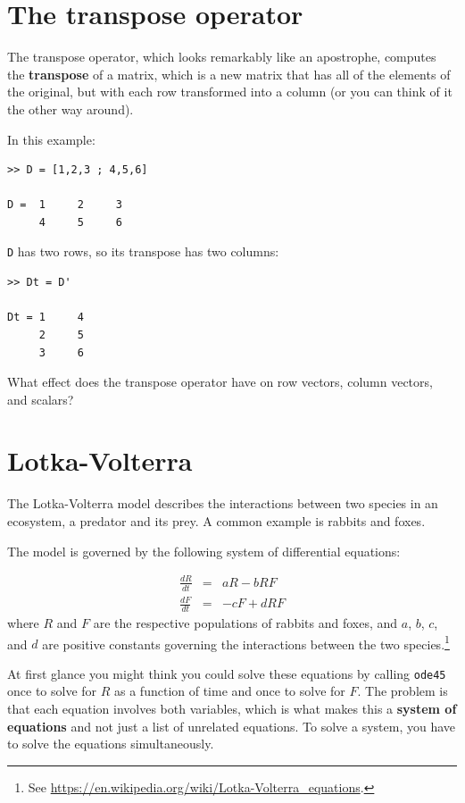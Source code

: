 \documentclass{book}
\begin{document}
\section{The transpose operator}

The transpose operator, which looks remarkably like an apostrophe,
computes the {\bf transpose} of a matrix, which is a new matrix
that has all of the elements of the original, but with each row
transformed into a column (or you can think of it the other way around).

In this example:

\begin{verbatim}
>> D = [1,2,3 ; 4,5,6]

D =  1     2     3
     4     5     6
\end{verbatim}

{\tt D} has two rows, so its transpose has two columns:

\begin{verbatim}
>> Dt = D'

Dt = 1     4
     2     5
     3     6
\end{verbatim}

\begin{ex}
What effect does the transpose operator
have on row vectors, column vectors, and scalars?
\end{ex}


\section{Lotka-Volterra}
\label{lotka}

The Lotka-Volterra model describes the interactions between two
species in an ecosystem, a predator and its prey.  A common example
is rabbits and foxes.

The model is governed by the following system of differential equations:

\begin{eqnarray}
    \frac{dR}{dt} &=& a R - b R F
    \\
    \frac{dF}{dt} &=& - c F + d R F
\end{eqnarray}
%
where $R$ and $F$ are the respective populations of rabbits and foxes,
and $a$, $b$, $c$, and $d$ are positive constants
governing the interactions between the two species.\footnote{See
\url{https://en.wikipedia.org/wiki/Lotka-Volterra_equations}.}

At first glance you might think you could solve these equations by
calling {\tt ode45} once to solve for $R$ as a function of time and
once to solve for $F$.  The problem is that each equation involves
both variables, which is what makes this a {\bf system of equations}
and not just a list of unrelated equations.  To solve a system, you
have to solve the equations simultaneously.
\end{document}
